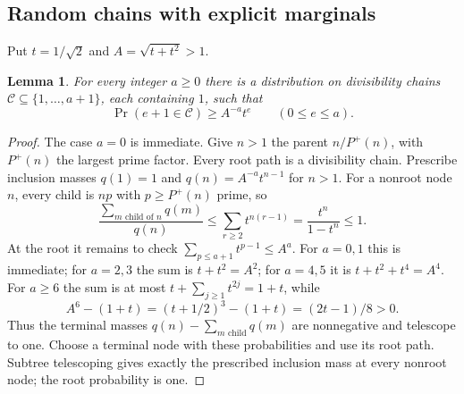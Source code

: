 \documentclass[11pt,a4paper]{article}
\newtheorem{lemma}[theorem]{Lemma}
\theoremstyle{remark}
\begin{document}
\subsection{Random chains with explicit marginals}
Put $t=1/\sqrt2$ and $A=\sqrt{t+t^2}>1$.

\begin{lemma}\label{lem:chains}
For every integer $a\ge0$ there is a distribution on divisibility chains
$\mathcal C\subseteq\{1,\ldots,a+1\}$, each containing $1$, such that
\[
 \Pr(e+1\in\mathcal C)\ge A^{-a}t^e\qquad(0\le e\le a).
\]
\end{lemma}
\begin{proof}
The case $a=0$ is immediate. Give $n>1$ the parent $n/P^+(n)$, with
$P^+(n)$ the largest prime factor. Every root path is a divisibility chain.
Prescribe inclusion masses $q(1)=1$ and $q(n)=A^{-a}t^{n-1}$ for $n>1$.
For a nonroot node $n$, every child is $np$ with $p\ge P^+(n)$ prime, so
\[
 \frac{\sum_{m\text{ child of }n}q(m)}{q(n)}
 \le\sum_{r\ge2}t^{n(r-1)}=\frac{t^n}{1-t^n}\le1.
\]
At the root it remains to check $\sum_{p\le a+1}t^{p-1}\le A^a$.
For $a=0,1$ this is immediate; for $a=2,3$ the sum is $t+t^2=A^2$;
for $a=4,5$ it is $t+t^2+t^4=A^4$. For $a\ge6$ the sum is at most
$t+\sum_{j\ge1}t^{2j}=1+t$, while
\[
 A^6-(1+t)=(t+1/2)^3-(1+t)=(2t-1)/8>0.
\]
Thus the terminal masses $q(n)-\sum_{m\text{ child}}q(m)$ are nonnegative
and telescope to one. Choose a terminal node with these probabilities and
use its root path. Subtree telescoping gives exactly the prescribed inclusion
mass at every nonroot node; the root probability is one.
\end{proof}
\end{document}

